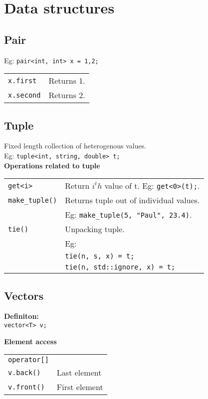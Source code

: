 \section{Data structures}

\subsection{Pair}
Eg: \texttt{pair<int, int> x = {1,2};}\\
\begin{tabularx}{\linewidth}{lX}
\texttt{x.first} & Returns 1. \\
\texttt{x.second} & Returns 2.
\end{tabularx}

\subsection{Tuple}
Fixed length collection of heterogenous values.\\
Eg: \texttt{tuple<int, string, double> t;}\\

\textbf{Operations related to tuple}\\
\begin{tabularx}{\linewidth}{lX}
\texttt{get<i>} & Return $i^th$ value of t. Eg: \texttt{get<0>(t);}.\\
\texttt{make\_tuple()} & Returns tuple out of individual values.\\
& Eg: \texttt{make\_tuple(5, "Paul", 23.4)}.\\
\texttt{tie()} & Unpacking tuple.\\
& Eg: \\
& \texttt{tie(n, s, x) = t;}\\
& \texttt{tie(n, std::ignore, x) = t;}\\
\end{tabularx}

\subsection{Vectors}

\textbf{Definiton:}\\
\texttt{vector<T> v;} 

\textbf{Element access}

\begin{tabularx}{\linewidth}{lX}
\texttt{operator[]}	& \\
\texttt{v.back()} & Last element \\
\texttt{v.front()} & First element \\
\end{tabularx}


